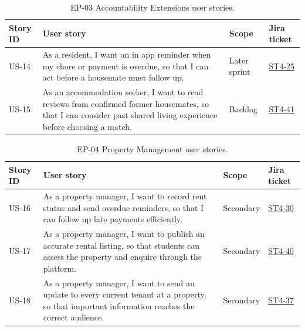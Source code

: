 \documentclass[11pt,a4paper]{article}
\begin{document}
\begin{table}[H]
    \centering
    \small
    \caption{EP-03 Accountability Extensions user stories.}
    \begin{tabularx}{\textwidth}{@{}L{1.4cm}Y L{1.8cm}L{2.2cm}@{}}
        \toprule
        Story ID & User story & Scope & Jira ticket\\
        \midrule
        US-14 & As a resident, I want an in app reminder when my chore or payment is overdue, so that I can act before a housemate must follow up. & Later sprint & \href{https://unsw-team-desn-seng2026.atlassian.net/browse/ST4-25}{ST4-25}\\
        US-15 & As an accommodation seeker, I want to read reviews from confirmed former housemates, so that I can consider past shared living experience before choosing a match. & Backlog & \href{https://unsw-team-desn-seng2026.atlassian.net/browse/ST4-41}{ST4-41}\\
        \bottomrule
    \end{tabularx}
    \label{tabstoriesep03}
\end{table}

\begin{table}[H]
    \centering
    \small
    \caption{EP-04 Property Management user stories.}
    \begin{tabularx}{\textwidth}{@{}L{1.4cm}Y L{1.8cm}L{2.2cm}@{}}
        \toprule
        Story ID & User story & Scope & Jira ticket\\
        \midrule
        US-16 & As a property manager, I want to record rent status and send overdue reminders, so that I can follow up late payments efficiently. & Secondary & \href{https://unsw-team-desn-seng2026.atlassian.net/browse/ST4-30}{ST4-30}\\
        US-17 & As a property manager, I want to publish an accurate rental listing, so that students can assess the property and enquire through the platform. & Secondary & \href{https://unsw-team-desn-seng2026.atlassian.net/browse/ST4-40}{ST4-40}\\
        US-18 & As a property manager, I want to send an update to every current tenant at a property, so that important information reaches the correct audience. & Secondary & \href{https://unsw-team-desn-seng2026.atlassian.net/browse/ST4-37}{ST4-37}\\
        \bottomrule
    \end{tabularx}
    \label{tabstoriesep04}
\end{table}
\end{document}
